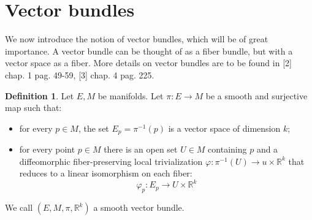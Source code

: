 \documentclass[12pt,a4paper]{report}
\theoremstyle{definition}
\newtheorem{Def}{Definition}[chapter]
\theoremstyle{Theorem}
\theoremstyle{definition}
\theoremstyle{definition}
\begin{document}
	\section{Vector bundles}
	We now introduce the notion of vector bundles, which will be of great importance. A vector bundle can be thought of as a fiber bundle, but with a vector space as a fiber. More details on vector bundles are to be found in [2] chap. 1 pag. 49-59, [3] chap. 4 pag. 225.
	\begin{Def}\label{Def_5.2}
		Let $E,M$ be manifolds. Let $\pi:E\rightarrow M$ be a smooth and surjective map such that:
		\begin{itemize}
			\item for every $p\in M$, the set $E_p=\pi^{-1}(p)$ is a vector space of dimension $k$;
			\item for every point $p\in M$ there is an open set $U\in M$ containing $p$ and a diffeomorphic fiber-preserving local trivialization $\varphi:\pi^{-1}(U)\rightarrow u\times \mathbb{R}^k$ that reduces to a linear isomorphism on each fiber:
			$$\varphi_p:E_p\rightarrow U\times \mathbb{R}^k$$
		\end{itemize}
		We call $(E,M,\pi,\mathbb{R}^k)$ a smooth vector bundle.
	\end{Def}
\end{document}
